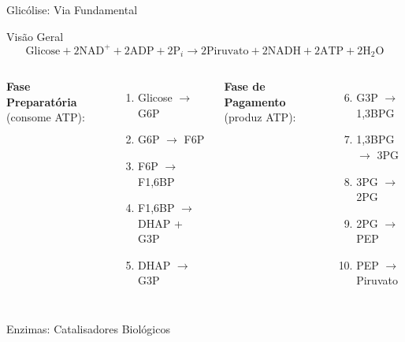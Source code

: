 \begin{frame}[allowframebreaks]{Glicólise: Via Fundamental}
\begin{block}{Visão Geral}
\begin{equation*}
\text{Glicose} + 2\text{NAD}^+ + 2\text{ADP} + 2\text{P}_i \rightarrow 2\text{Piruvato} + 2\text{NADH} + 2\text{ATP} + 2\text{H}_2\text{O}
\end{equation*}
\end{block}

\begin{columns}
\textbf{Fase Preparatória} (consome ATP):
\begin{enumerate}
    \item Glicose $\rightarrow$ G6P
    \item G6P $\rightarrow$ F6P
    \item F6P $\rightarrow$ F1,6BP
    \item F1,6BP $\rightarrow$ DHAP + G3P
    \item DHAP $\rightarrow$ G3P
\end{enumerate}

\textbf{Fase de Pagamento} (produz ATP):
\begin{enumerate}
    \setcounter{enumi}{5}
    \item G3P $\rightarrow$ 1,3BPG
    \item 1,3BPG $\rightarrow$ 3PG
    \item 3PG $\rightarrow$ 2PG
    \item 2PG $\rightarrow$ PEP
    \item PEP $\rightarrow$ Piruvato
\end{enumerate}
\end{columns}

\vspace{0.3cm}

\end{frame}

\begin{frame}{Enzimas: Catalisadores Biológicos}

\end{frame}

